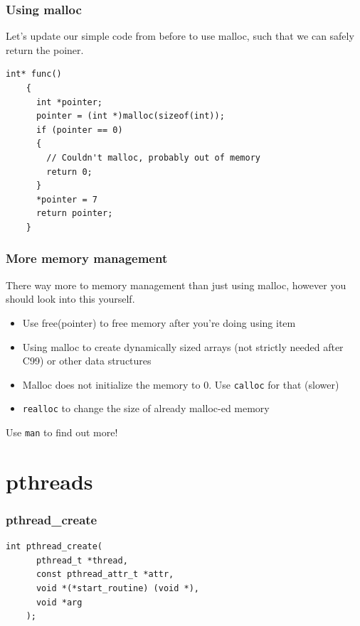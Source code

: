 \documentclass{beamer}
\begin{document}
\begin{frame}[fragile]
  \frametitle{Using malloc}
  Let's update our simple code from before to use malloc, such that we can safely return the poiner.
  \begin{lstlisting}[style=customc]
    int* func()
    {
      int *pointer;
      pointer = (int *)malloc(sizeof(int));
      if (pointer == 0)
      {
        // Couldn't malloc, probably out of memory
        return 0;
      }
      *pointer = 7
      return pointer;
    }
    \end{lstlisting}
\end{frame}
\begin{frame}
  \frametitle{More memory management}
  There way more to memory management than just using malloc, however you should look into this yourself.
  \begin{itemize}
    \item Use free(pointer) to free memory after you're doing using item
    \item Using malloc to create dynamically sized arrays (not strictly needed after C99) or other data structures
    \item Malloc does not initialize the memory to 0. Use \texttt{calloc} for that (slower)
    \item \texttt{realloc} to change the size of already malloc-ed memory
  \end{itemize}
  Use \texttt{man} to find out more!
\end{frame}
\section{pthreads}
\begin{frame}[fragile]
  \frametitle{pthread\_create}
  \begin{lstlisting}[style=customc]
    int pthread_create(
      pthread_t *thread, 
      const pthread_attr_t *attr, 
      void *(*start_routine) (void *), 
      void *arg
    );
  \end{lstlisting}
\end{frame}
\end{document}
